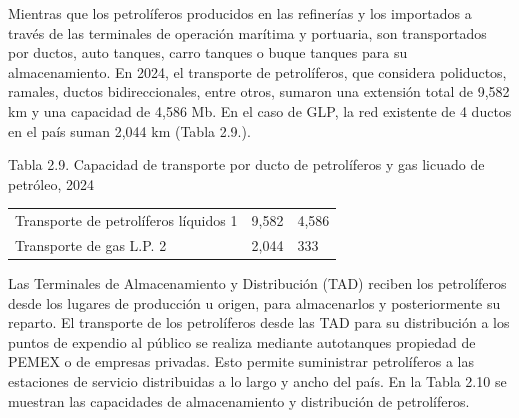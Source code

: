 \documentclass{sener2025}
\begin{document}
Mientras que los petrolíferos producidos en las refinerías y los importados a través de las terminales de operación marítima y portuaria, son transportados por ductos, auto tanques, carro tanques o buque tanques para su almacenamiento. En 2024, el transporte de petrolíferos, que considera poliductos, ramales, ductos bidireccionales, entre otros, sumaron una extensión total de 9,582 km y una capacidad de 4,586 Mb. En el caso de GLP, la red existente de 4 ductos en el país suman 2,044 km (Tabla 2.9.).

\begin{tabladoradoCorto}
  \caption{Tabla 2.9. Capacidad de transporte por ducto de petrolíferos y gas licuado de petróleo, 2024}
  \label{tab:tabla_2_9__capacidad_de_transp}
  \begin{tabularx}{\textwidth}{Vvv}
    \toprule
      &  &  \\
    \midrule
    Transporte de petrolíferos líquidos 1 & 9,582 & 4,586 \\
    Transporte de gas L.P. 2 & 2,044 & 333 \\
    \bottomrule
  \end{tabularx}
\end{tabladoradoCorto}
\vspace{-4pt}


Las Terminales de Almacenamiento y Distribución (TAD) reciben los petrolíferos desde los lugares de producción u origen, para almacenarlos y posteriormente su reparto. El transporte de los petrolíferos desde las TAD para su distribución a los puntos de expendio al público se realiza mediante autotanques propiedad de PEMEX o de empresas privadas. Esto permite suministrar petrolíferos a las estaciones de servicio distribuidas a lo largo y ancho del país. En la Tabla 2.10 se muestran las capacidades de almacenamiento y distribución de petrolíferos.
\end{document}
